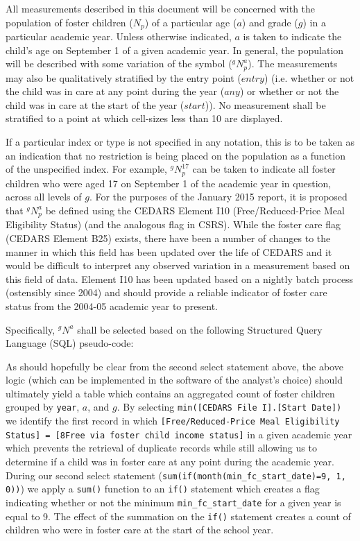 \documentclass[12pt]{article}\usepackage[]{graphicx}\usepackage[]{color}
\begin{document}
All measurements described in this document will be concerned with the population of foster children ($N_p$) of a particular age ($a$) and grade ($g$) in a particular academic year. Unless otherwise indicated, $a$ is taken to indicate the child's age on September 1 of a given academic year. In general, the population will be described with some variation of the symbol (${}^gN_{p}^a$). The measurements may also be qualitatively stratified by the entry point ($entry$) (i.e. whether or not the child was in care at any point during the year ($any$) or whether or not the child was in care at the start of the year ($start$)). No measurement shall be stratified to a point at which cell-sizes less than 10 are displayed. 

If a particular index or type is not specified in any notation, this is to be taken as an indication that no restriction is being placed on the population as a function of the unspecified index. For example, ${}^gN_p^{17}$ can be taken to indicate all foster children who were aged 17 on September 1 of the academic year in question, across all levels of $g$. For the purposes of the January 2015 report, it is proposed that ${}^{g}N_{p}^a$ be defined using the CEDARS Element I10 (Free/Reduced-Price Meal Eligibility Status) (and the analogous flag in CSRS). While the foster care flag (CEDARS Element B25) exists, there have been a number of changes to the manner in which this field has been updated over the life of CEDARS and it would be difficult to interpret any observed variation in a measurement based on this field of data. Element I10 has been updated based on a nightly batch process (ostensibly since 2004) and should provide a reliable indicator of foster care status from the 2004-05 academic year to present. 

Specifically, ${}^{g}N^a$ shall be selected based on the following Structured Query Language (SQL) pseudo-code: 



As should hopefully be clear from the second select statement above, the above logic (which can be implemented in the software of the analyst's choice) should ultimately yield a table which contains an aggregated count of foster children grouped by \texttt{year}, $a$, and $g$. By selecting \texttt{min([CEDARS File I].[Start Date])} we identify the first record in which \texttt{[Free/Reduced-Price Meal Eligibility Status] = [8Free via foster child income status]} in a given academic year which prevents the retrieval of duplicate records while still allowing us to determine if a child was in foster care at any point during the academic year. During our second select statement (\texttt{sum(if(month(min\_fc\_start\_date)=9, 1, 0))}) we apply a \texttt{sum()} function to an \texttt{if()} statement which creates a flag indicating whether or not the minimum \texttt{min\_fc\_start\_date} for a given year is equal to 9. The effect of the summation on the \texttt{if()} statement creates a count of children who were in foster care at the start of the school year. 
\end{document}
